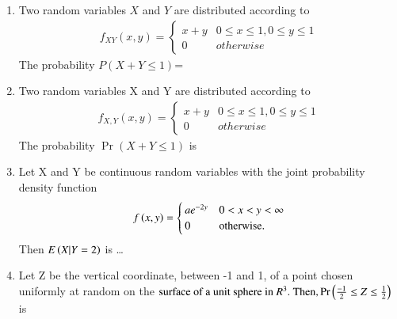 \begin{enumerate}[label=\thesection.\arabic*.,ref=\thesection.\theenumi]
\begin{enumerate}
            \end{enumerate}
            \solution
            
            
%
\item Two random variables  $X$ and $Y$ are distributed according to 
\begin{align}
f_{XY}(x,y)=  \begin{cases}
    x+y & 0\leq x \leq 1, 0\leq y \leq 1 \\
    0 & otherwise
\end{cases}
\end{align}
The probability $P(X+Y \leq 1)$=
%
\solution
% 

\item Two random variables X and Y are distributed according to
\begin{align}
 f_{X,Y}(x,y)=\begin{cases} 
      x+y & 0\leq x\leq 1, 0\leq y\leq 1 \\
      0 & otherwise
  \end{cases}
\end{align}
The probability $\Pr(X+Y\leq 1)$ is 
%
\solution

%
\item Let X and Y be continuous random variables with the joint probability density function 
\begin{align}
f\left(x,y\right)= 
\begin{cases}
ae^{-2y} & 0<x<y<\infty \\
0 & \text{otherwise}.
\end{cases}   
\end{align}
Then $E\left(X|Y=2\right)$ is \dots
\solution

%
\item Let Z be the vertical coordinate, between -1 and 1, of a point chosen uniformly at random on the
\begin{math}
\text{surface of a unit sphere in }R^3.\text{ Then,} \Pr\left(\frac{-1}{2} \leq Z \leq \frac{1}{2}\right)
\end{math}
is
\\
  \solution
  


\end{enumerate}
